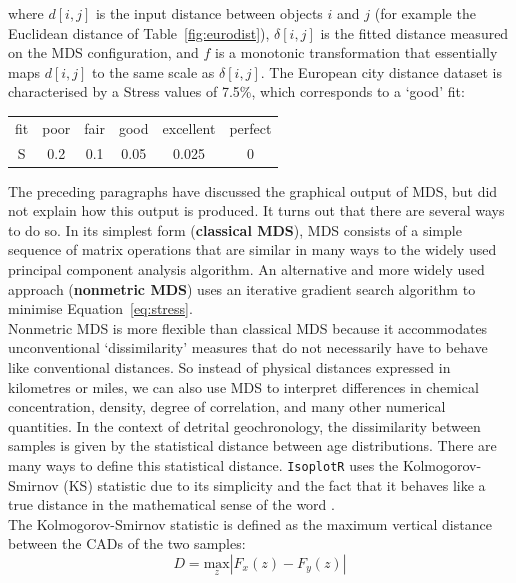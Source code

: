 \begin{refsection}
\noindent where $d[i,j]$ is the input distance between objects $i$ and
$j$ (for example the Euclidean distance of Table~\ref{fig:eurodist}),
$\delta[i,j]$ is the fitted distance measured on the MDS
configuration, and $f$ is a monotonic transformation that essentially
maps $d[i,j]$ to the same scale as $\delta[i,j]$.  The European city
distance dataset is characterised by a Stress values of 7.5\%, which
corresponds to a `good' fit:
\begin{center}
  \begin{tabular}{c|ccccc}
    fit & poor & fair & good & excellent & perfect \\
    S & 0.2 & 0.1 & 0.05 & 0.025 & 0
  \end{tabular}
  \label{tab:S}
\end{center}

The preceding paragraphs have discussed the graphical output of MDS,
but did not explain how this output is produced. It turns out that
there are several ways to do so. In its simplest form
(\textbf{classical MDS}), MDS consists of a simple sequence of matrix
operations that are similar in many ways to the widely used principal
component analysis algorithm. An alternative and more widely used
approach (\textbf{nonmetric MDS}) uses an iterative gradient search
algorithm to minimise Equation~\ref{eq:stress}.\\

Nonmetric MDS is more flexible than classical MDS because it
accommodates unconventional `dissimilarity' measures that do not
necessarily have to behave like conventional distances. So instead of
physical distances expressed in kilometres or miles, we can also use
MDS to interpret differences in chemical concentration, density,
degree of correlation, and many other numerical quantities.  In the
context of detrital geochronology, the dissimilarity between samples
is given by the statistical distance between age distributions. There
are many ways to define this statistical distance. \texttt{IsoplotR}
uses the Kolmogorov-Smirnov (KS) statistic due to its simplicity and
the fact that it behaves like a true distance in the mathematical
sense of the word \citep{vermeesch2013, vermeesch2018b}.\\

The Kolmogorov-Smirnov statistic is defined as the maximum vertical
distance between the CADs of the two samples:
\begin{equation}
  D = \underset{z}{\mbox{max}} |F_x(z) - F_y(z)|
  \label{eq:KS}
\end{equation}


\end{refsection}
